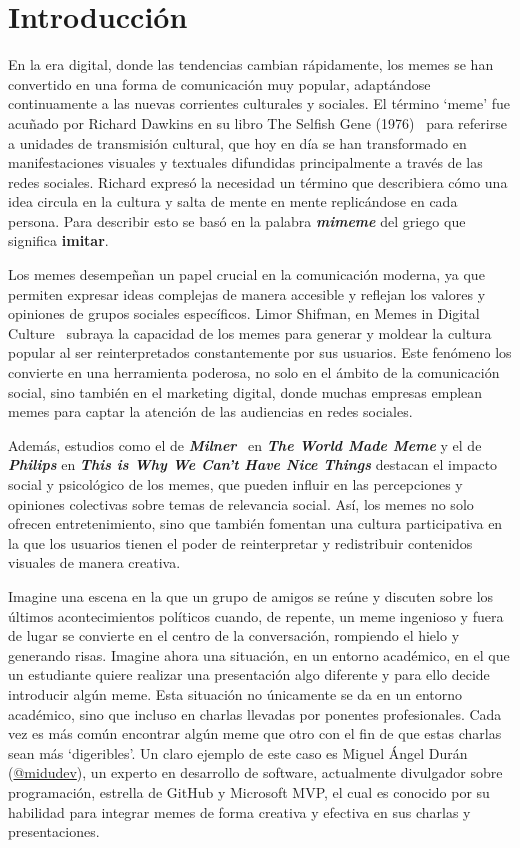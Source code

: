 \chapter{Introducción}

En la era digital, donde las tendencias cambian rápidamente, los memes se han convertido en una forma de comunicación muy popular, adaptándose continuamente a las nuevas corrientes culturales y sociales. El término `meme' fue acuñado por Richard Dawkins en su libro The Selfish Gene (1976)~\cite{dawkins2016selfish} para referirse a unidades de transmisión cultural, que hoy en día se han transformado en manifestaciones visuales y textuales difundidas principalmente a través de las redes sociales. Richard expresó la necesidad un término que describiera cómo una idea circula en la cultura y salta de mente en mente replicándose en cada persona. Para describir esto se basó en la palabra \textit{\textbf{mimeme}} del griego que significa \textbf{imitar}.

Los memes desempeñan un papel crucial en la comunicación moderna, ya que permiten expresar ideas complejas de manera accesible y reflejan los valores y opiniones de grupos sociales específicos. Limor Shifman, en Memes in Digital Culture~\cite{lehman2016memes} subraya la capacidad de los memes para generar y moldear la cultura popular al ser reinterpretados constantemente por sus usuarios. Este fenómeno los convierte en una herramienta poderosa, no solo en el ámbito de la comunicación social, sino también en el marketing digital, donde muchas empresas emplean memes para captar la atención de las audiencias en redes sociales.

Además, estudios como el de \textit{\textbf{Milner}}~\cite{milner2018world} en \textit{\textbf{The World Made Meme}} y el de \textit{\textbf{Philips}} en \textit{\textbf{This is Why We Can't Have Nice Things}}\cite{phillips2015we} destacan el impacto social y psicológico de los memes, que pueden influir en las percepciones y opiniones colectivas sobre temas de relevancia social. Así, los memes no solo ofrecen entretenimiento, sino que también fomentan una cultura participativa en la que los usuarios tienen el poder de reinterpretar y redistribuir contenidos visuales de manera creativa.

Imagine una escena en la que un grupo de amigos se reúne y discuten sobre los últimos acontecimientos políticos cuando, de repente, un meme ingenioso y fuera de lugar se convierte en el centro de la conversación, rompiendo el hielo y generando risas. Imagine ahora una situación, en un entorno académico, en el que un estudiante quiere realizar una presentación algo diferente y para ello decide introducir algún meme. Esta situación no únicamente se da en un entorno académico, sino que incluso en charlas llevadas por ponentes profesionales. Cada vez es más común encontrar algún meme que otro con el fin de que estas charlas sean más `digeribles'. Un claro ejemplo de este caso es Miguel Ángel Durán (\href{https://midu.dev/}{@midudev}), un experto en desarrollo de software, actualmente divulgador sobre programación, estrella de GitHub y Microsoft MVP, el cual es conocido por su habilidad para integrar memes de forma creativa y efectiva en sus charlas y presentaciones.

